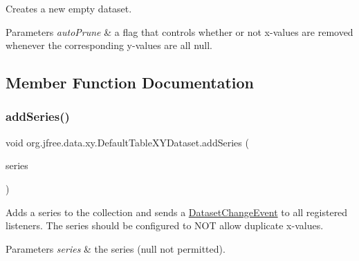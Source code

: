 Creates a new empty dataset.


\begin{DoxyParams}{Parameters}
{\em auto\+Prune} & a flag that controls whether or not x-\/values are removed whenever the corresponding y-\/values are all {\ttfamily null}. \\
\hline
\end{DoxyParams}


\subsection{Member Function Documentation}
\mbox{\label{classorg_1_1jfree_1_1data_1_1xy_1_1_default_table_x_y_dataset_a16f4ab104b2bf8233387ed0ead6b6487}} 
\subsubsection{\texorpdfstring{add\+Series()}{addSeries()}}
{\footnotesize\ttfamily void org.\+jfree.\+data.\+xy.\+Default\+Table\+X\+Y\+Dataset.\+add\+Series (\begin{DoxyParamCaption}\item[{\mbox{\hyperlink{classorg_1_1jfree_1_1data_1_1xy_1_1_x_y_series}{X\+Y\+Series}}}]{series }\end{DoxyParamCaption})}

Adds a series to the collection and sends a \mbox{\hyperlink{}{Dataset\+Change\+Event}} to all registered listeners. The series should be configured to N\+OT allow duplicate x-\/values.


\begin{DoxyParams}{Parameters}
{\em series} & the series ({\ttfamily null} not permitted). \\
\hline
\end{DoxyParams}
\mbox{\label{classorg_1_1jfree_1_1data_1_1xy_1_1_default_table_x_y_dataset_aa5def13df2beb3623661177c1795c200}} 
